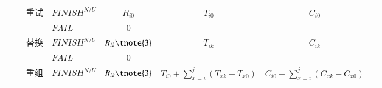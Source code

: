 \begin{table}[htbp]
\begin{threeparttable}
\begin{tabular}{llllllll}
            \multicolumn{1}{|c|}{} 
            &       
            & \multicolumn{1}{|c}{\multirow{2}{*}{重试}} 
            & \multicolumn{1}{|l}{$FINISH^{N/U}$} 
            & \multicolumn{1}{|c}{$R_{i0}$} 
            & \multicolumn{1}{|c}{\multirow{2}{*}{$T_{i0}$}} 
            & \multicolumn{1}{|c|}{\multirow{2}{*}{$C_{i0}$}} \\
            
            \multicolumn{1}{|c|}{} 
            &       
            & \multicolumn{1}{|c}{}
            & \multicolumn{1}{|l}{$FAIL$} 
            & \multicolumn{1}{|c}{0} 
            & \multicolumn{1}{|c}{}
            & \multicolumn{1}{|c|}{} \\
            \cline{3-7}
            
            \multicolumn{1}{|c|}{} 
            &       
            & \multicolumn{1}{|c}{\multirow{2}{*}{替换}} 
            & \multicolumn{1}{|l}{$FINISH^{N/U}$} 
            & \multicolumn{1}{|c}{$R_{ik}\tnote{3}$} 
            & \multicolumn{1}{|c}{\multirow{2}{*}{${T_{ik}}$}} 
            & \multicolumn{1}{|c|}{\multirow{2}{*}{${C_{ik}}$}} \\
            
            \multicolumn{1}{|c|}{} 
            &       
            & \multicolumn{1}{|c}{} 
            & \multicolumn{1}{|l}{$FAIL$} 
            & \multicolumn{1}{|c}{0} 
            & \multicolumn{1}{|c}{} 
            & \multicolumn{1}{|c|}{} \\
            \cline{3-7}
            
            \multicolumn{1}{|c|}{} 
            &       
            & \multicolumn{1}{|c}{\multirow{2}{*}{重组}} 
            & \multicolumn{1}{|l}{$FINISH^{N/U}$} 
            & \multicolumn{1}{|c}{$R_{ik}\tnote{3}$} 
            & \multicolumn{1}{|c}{\multirow{2}{*}{${T_{i0}} + \sum\limits_{x = i}^j {({T_{xk}} - {T_{x0}})} $}}
            & \multicolumn{1}{|c|}{\multirow{2}{*}{${C_{i0}} + \sum\limits_{x = i}^j {({C_{xk}} - {C_{x0}})} $}} \\
            

\end{tabular}
\end{threeparttable}
\end{table}
